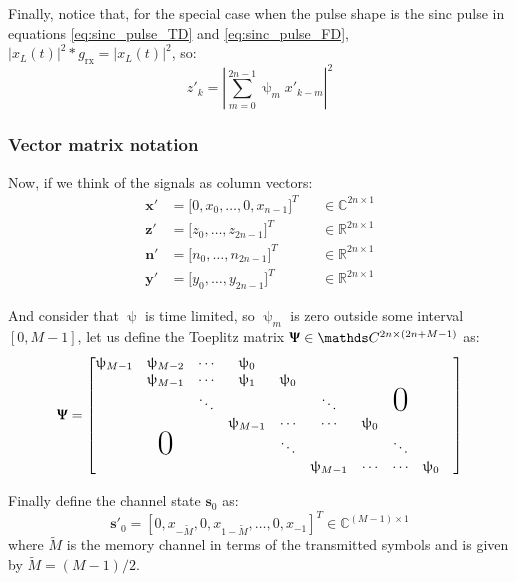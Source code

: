 Finally, notice that, for the special case when the pulse shape is the sinc pulse in equations \ref{eq:sinc_pulse_TD} and \ref{eq:sinc_pulse_FD}, $|x_L(t)|^2*g_\text{rx}=|x_L(t)|^2$, so:
\begin{equation}
z'_k=\left|\sum_{m=0}^{2n-1}\uppsi_mx'_{k-m}\right|^2
\end{equation}


\subsubsection{Vector matrix notation}

Now, if we think of the signals as column vectors:
\begin{align*}
	\bm x'&=\bigl[0,x_0,\dotsc,0,x_{n-1}\bigr]^T &&\in\mathds C^{2n\times1}\\
	\bm z'&=\bigl[z_0,\dotsc,z_{2n-1}\bigr]^T &&\in\mathds R^{2n\times1}\\
	\bm n'&=\bigl[n_0,\dotsc,n_{2n-1}\bigr]^T &&\in\mathds R^{2n\times1}\\
	\bm y'&=\bigl[y_0,\dotsc,y_{2n-1}\bigr]^T &&\in\mathds R^{2n\times1}
\end{align*}

And consider that $\uppsi$ is time limited, so $\uppsi_m$ is zero outside some interval $[0,M-1]$, let us define the Toeplitz matrix
$\bm \Uppsi \in\mathds C^{2n\times(2n+M-1)}$ as:
\begin{equation}
	\bm \Uppsi = \begin{bmatrix}
				\uppsi_{M-1}&\uppsi_{M-2}&\cdots &\uppsi_0&&&\\
				&\uppsi_{M-1}&\cdots &\uppsi_1&\uppsi_0&&\\
				&&\ddots&&&\ddots&&\mbox{\Huge 0}&\\
				&&&\uppsi_{M-1}&\cdots&\cdots&\uppsi_0&\\
				&\mbox{\Huge 0}&&&\ddots&&&\ddots&&\\
				&&&&&\uppsi_{M-1}&\cdots&\cdots&\uppsi_0&\\
			     \end{bmatrix}
\end{equation}

Finally define the channel state $\bm s_0$ as:
\begin{equation}
\bm{s}'_0=[0,x_{-\widetilde{M}},0,x_{1-\widetilde{M}},\dotsc,0,x_{-1}]^T \in \mathds{C}^{(M-1)\times1}
\end{equation}
where $\widetilde{M}$ is the memory channel in terms of the transmitted symbols and is given by $\widetilde{M}=(M-1)/2$.


